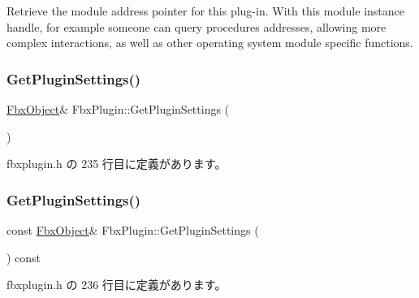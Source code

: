 Retrieve the module address pointer for this plug-\/in. With this module instance handle, for example someone can query procedures addresses, allowing more complex interactions, as well as other operating system module specific functions. \mbox{\label{class_fbx_plugin_aae9cc7178878f2350538b74e183f46cb}} 
\subsubsection{\texorpdfstring{Get\+Plugin\+Settings()}{GetPluginSettings()}\hspace{0.1cm}{\footnotesize\ttfamily [1/2]}}
{\footnotesize\ttfamily \hyperlink{class_fbx_object}{Fbx\+Object}\& Fbx\+Plugin\+::\+Get\+Plugin\+Settings (\begin{DoxyParamCaption}{ }\end{DoxyParamCaption})\hspace{0.3cm}{\ttfamily [inline]}}



 fbxplugin.\+h の 235 行目に定義があります。

\mbox{\label{class_fbx_plugin_a3f5e6d9e20e306ceee8f163bbf59fe58}} 
\subsubsection{\texorpdfstring{Get\+Plugin\+Settings()}{GetPluginSettings()}\hspace{0.1cm}{\footnotesize\ttfamily [2/2]}}
{\footnotesize\ttfamily const \hyperlink{class_fbx_object}{Fbx\+Object}\& Fbx\+Plugin\+::\+Get\+Plugin\+Settings (\begin{DoxyParamCaption}{ }\end{DoxyParamCaption}) const\hspace{0.3cm}{\ttfamily [inline]}}



 fbxplugin.\+h の 236 行目に定義があります。

\mbox{\label{class_fbx_plugin_ac39bc91afc422603d99fea3c09700814}} 
